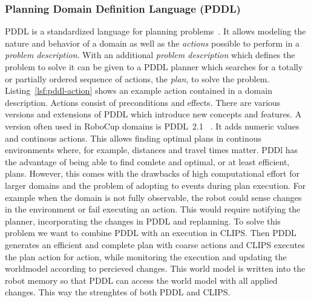 \documentclass[a4paper,11pt]{article}
\newcommand{\reflst}[1]{Listing~\ref{#1}}
\begin{document}
\subsubsection{Planning Domain Definition Language (PDDL)} PDDL is a
standardized language for planning problems~\cite{PDDL}. It allows
modeling the nature and behavior of a domain as well as the
\emph{actions} possible to perform in a \emph{problem
  description}. With an additional \emph{problem description} which
defines the problem to solve it can be given to a PDDL planner which
searches for a totally or partially ordered sequence of actions, the
\emph{plan}, to solve the problem.
%
%
\reflst{lsf:pddl-action} shows an example action contained in a domain
description. Actions consist of preconditions and effects.  There are
various versions and extensions of PDDL which introduce new concepts
and features. A version often used in RoboCup domains is
PDDL~2.1~\cite{PDDL2.1} . It adds numeric values and
continous actions. This allows finding optimal plans in continous
environments where, for example, distances and travel times
matter. PDDl has the advantage of being able to find comlete and
optimal, or at least efficient, plans. However, this comes with the
drawbacks of high computational effort for larger domains and the
problem of adopting to events during plan execution. For example when
the domain is not fully observable, the robot could sense changes in
the environment or fail executing an action. This would require
notifying the planner, incorporating the changes in PDDL and
replanning. To solve this problem we want to combine PDDL with an
execution in CLIPS. Then PDDL generates an efficient and complete plan
with coarse actions and CLIPS executes the plan action for action,
while monitoring the execution and updating the worldmodel according
to percieved changes. This world model is written into the robot
memory so that PDDL can access the world model with all applied
changes. This way the strenghtes of both PDDL and CLIPS.
\end{document}

